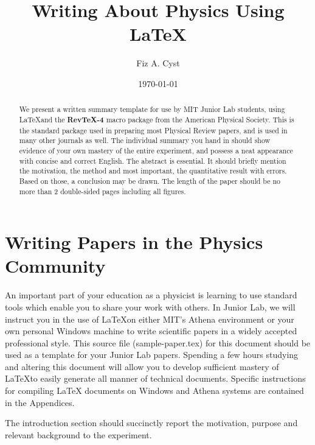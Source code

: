 \title{Writing About Physics Using \LaTeX}
\author         {Fiz A. Cyst}
\date{\today}

\begin{abstract}
We present a written summary template for use by MIT Junior Lab
students, using \LaTeX and the {\bf RevTeX-4} macro package from the
American Physical Society.  This is the standard package used in
preparing most Physical Review papers, and is used in many other
journals as well.  The individual summary you hand in should show
evidence of your own mastery of the entire experiment, and possess a
neat appearance with concise and correct English.  The abstract is
essential.  It should briefly mention the motivation, the method and
most important, the quantitative result with errors.  Based on those,
a conclusion may be drawn.  The length of the paper should be no more
than 2 double-sided pages including all figures.
\end{abstract}

\maketitle


\section{Writing Papers in the Physics Community}

An important part of your education as a physicist is learning to
use standard tools which enable you to share your work with others.
In Junior Lab, we will instruct you in the use of \LaTeX on either
MIT's Athena environment or your own personal Windows machine to
write scientific papers in a widely accepted professional style.
This source file (sample-paper.tex) for this document should be used
as a template for your Junior Lab papers. Spending a few hours
studying and altering this document will allow you to develop
sufficient mastery of \LaTeX to easily generate all manner of
technical documents.  Specific instructions for compiling \LaTeX
documents on Windows and Athena systems are contained in the
Appendices.

The introduction section should succinctly report the motivation,
purpose and relevant background to the experiment.

